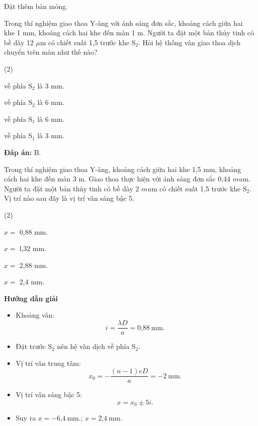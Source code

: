\begin{dang}{Đặt thêm bản mỏng.}
{		Trong thí nghiệm giao thoa  Y-âng với ánh sáng đơn sắc, khoảng cách giữa hai khe 1 mm, khoảng cách hai khe đến màn 1 m. Người ta đặt một bản thủy tinh có bề dày 12 $\mu$m có chiết suất 1,5 trước khe $\text{S}_2$. Hỏi hệ thống vân giao thoa dịch chuyển trên màn như thế nào?
		\begin{mcq}(2)
			\item về phía $\text{S}_2$ là 3 mm.					
			\item về phía $\text{S}_2$  là 6 mm.
			\item về phía $\text{S}_1$ là 6 mm.					
			\item về phía $\text{S}_1$ là 3 mm.
		\end{mcq}
		
		\textbf{Đáp án:} B.
	}
	
	{Trong thí nghiệm giao thoa Y-âng, khoảng cách giữa hai khe 1,5 mm, khoảng cách hai khe đến màn 3 m. Giao thoa thực hiện với ánh sáng đơn sắc 0,44 $mu$m. Người ta đặt một bản thủy tinh có bề dày 2 $mu$m có chiết suất 1,5 trước khe $\text{S}_2$. Vị trí nào sau đây là vị trí vân sáng bậc 5.
		\begin{mcq}(2)
			\item $x =$ 0,88 mm.		
			\item $x =$ l,32 mm.	  	
			\item $x =$ 2,88 mm.		
			\item $x =$ 2,4 mm.
		\end{mcq}
	}
	{\begin{center}
			\textbf{Hướng dẫn giải}
		\end{center}
		
		\begin{itemize}
			\item Khoảng vân:
			\begin{equation*}
				i=\dfrac{\lambda D}{a} = \text{0,88}\ \text{mm}.
			\end{equation*}
			\item Đặt trước $\text{S}_2$ nên hệ vân dịch về phía $\text{S}_2$.
			\item Vị trí vân trung tâm:
			\begin{equation*}
				x_0= - \dfrac{(n-1)eD}{a}=-2 \ \text{mm}.
			\end{equation*}
			\item Vị trí vân sáng bậc 5:
			\begin{equation*}
				x=x_0 \pm 5i.
			\end{equation*}
			\item Suy ra $x= -\text{6,4}\ \text{mm}.$; $x=\text{2,4}\ \text{mm}$.
		\end{itemize}
		
}
\end{dang}
